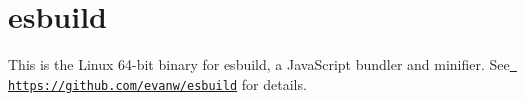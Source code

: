 \chapter{esbuild}
\hypertarget{md__2home_2solype_2delivery_2current__days_2Mannheim_2front_2node__modules_2_0desbuild_2linux-x64_2README}{}\label{md__2home_2solype_2delivery_2current__days_2Mannheim_2front_2node__modules_2_0desbuild_2linux-x64_2README}
\label{md__2home_2solype_2delivery_2current__days_2Mannheim_2front_2node__modules_2_0desbuild_2linux-x64_2README_autotoc_md183}%
%
 This is the Linux 64-\/bit binary for esbuild, a Java\+Script bundler and minifier. See \href{https://github.com/evanw/esbuild}{\texttt{ https\+://github.\+com/evanw/esbuild}} for details. 